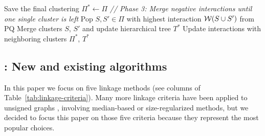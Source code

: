 \begin{algorithm}[t]
\begin{flushleft}
\begin{algorithmic}[1]
        \EndIf
      \State Save the final clustering $\Pi^* \gets \Pi$ 
      \State \emph{// Phase 3: Merge negative interactions until one single cluster is left}
      \Repeat
        \State Pop $S,S'\in\Pi$ with highest interaction $\mathcal{W}{}(S \cup S')$ from PQ 
        \State Merge clusters $S$, $S'$ and update hierarchical tree $T^*$
        \State Update interactions with neighboring clusters
      \State
      \Return $\Pi^*$, $T^*$
  \end{algorithmic}
    \label{main_alg}
  \end{flushleft}

\end{algorithm}


\subsection{\algname{}: New and existing algorithms} \label{sec:alg_update_rules}


In this paper we focus on five linkage methods (see columns of Table~\ref{tab:linkage-criteria}). Many more linkage criteria have been applied to unsigned graphs \cite{nunez2013machine,felzenszwalb2004efficient,funke2018large}, involving median-based or size-regularized methods, but we decided to focus this paper on those five criteria because they represent the most popular choices.  

